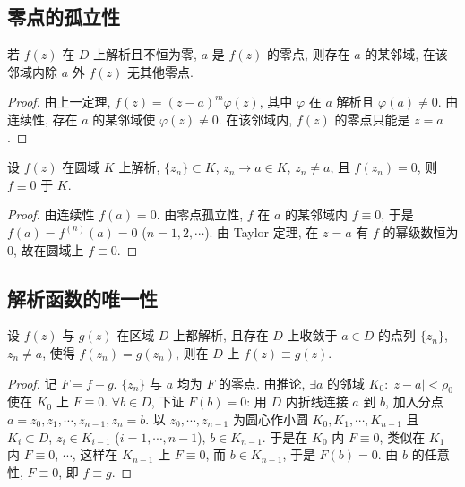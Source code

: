 \documentclass[theorem=false,mathfont=none,openany,sub3section]{easybook}
\begin{document}
\subsection{零点的孤立性}

\begin{theorem}[零点孤立性定理]
  若 $f(z)$ 在 $D$ 上解析且不恒为零, $a$ 是 $f(z)$ 的零点, 则存在 $a$ 的某邻域, 在该邻域内除 $a$ 外 $f(z)$ 无其他零点.
\end{theorem}

\begin{proof}
  由上一定理, $f(z)=(z-a)^{m}\varphi(z)$, 其中 $\varphi$ 在 $a$ 解析且 $\varphi(a)\neq0$. 由连续性, 存在 $a$ 的某邻域使 $\varphi(z)\neq0$. 在该邻域内, $f(z)$ 的零点只能是 $z=a$.
\end{proof}

\begin{corollary}
  设 $f(z)$ 在圆域 $K$ 上解析, $\{z_{n}\}\subset K$, $z_{n}\to a\in K$, $z_{n}\neq a$, 且 $f(z_{n})=0$, 则 $f\equiv0$ 于 $K$.
\end{corollary}

\begin{proof}
  由连续性 $f(a)=0$. 由零点孤立性, $f$ 在 $a$ 的某邻域内 $f\equiv0$, 于是 $f(a)=f^{(n)}(a)=0$ ($n=1,2,\cdots$).
  由 Taylor 定理, 在 $z=a$ 有 $f$ 的幂级数恒为 $0$, 故在圆域上 $f\equiv0$.
\end{proof}

\subsection{解析函数的唯一性}

\begin{theorem}[唯一性定理]
  设 $f(z)$ 与 $g(z)$ 在区域 $D$ 上都解析, 且存在 $D$ 上收敛于 $a\in D$ 的点列 $\{z_{n}\}$, $z_{n}\neq a$, 使得 $f(z_{n})=g(z_{n})$, 则在 $D$ 上 $f(z)\equiv g(z)$.
\end{theorem}

\begin{proof}
  记 $F=f-g$. $\{z_{n}\}$ 与 $a$ 均为 $F$ 的零点. 由推论, $\exists a$ 的邻域 $K_{0}:|z-a|<\rho_{0}$ 使在 $K_{0}$ 上 $F\equiv0$.
  $\forall b\in D$, 下证 $F(b)=0$:
  用 $D$ 内折线连接 $a$ 到 $b$, 加入分点 $a=z_{0},z_{1},\cdots,z_{n-1},z_{n}=b$.
  以 $z_{0},\cdots,z_{n-1}$ 为圆心作小圆 $K_{0},K_{1},\cdots,K_{n-1}$ 且 $K_{i}\subset D$,
  $z_{i}\in K_{i-1}$ ($i=1,\cdots,n-1$), $b\in K_{n-1}$.
  于是在 $K_{0}$ 内 $F\equiv0$, 类似在 $K_{1}$ 内 $F\equiv0$, $\cdots$, 这样在 $K_{n-1}$ 上 $F\equiv0$, 而 $b\in K_{n-1}$, 于是 $F(b)=0$.
  由 $b$ 的任意性, $F\equiv0$, 即 $f\equiv g$.
\end{proof}
\end{document}
